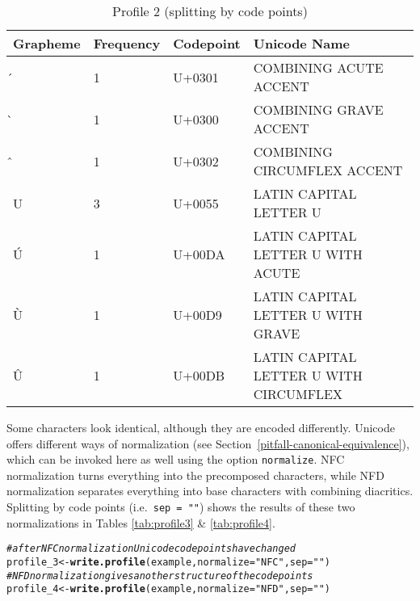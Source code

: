\documentclass[output=book,nonflat,modfonts,
citecolor=brown,
		]{langsci/langscibook}\usepackage[]{graphicx}\usepackage[]{color}
\makeatletter
\newcommand{\hlstr}[1]{\textcolor[rgb]{0.192,0.494,0.8}{#1}}%
\newcommand{\hlcom}[1]{\textcolor[rgb]{0.678,0.584,0.686}{\textit{#1}}}%
\newcommand{\hlstd}[1]{\textcolor[rgb]{0.345,0.345,0.345}{#1}}%
\newcommand{\hlkwb}[1]{\textcolor[rgb]{0.69,0.353,0.396}{#1}}%
\newcommand{\hlkwc}[1]{\textcolor[rgb]{0.333,0.667,0.333}{#1}}%
\newcommand{\hlkwd}[1]{\textcolor[rgb]{0.737,0.353,0.396}{\textbf{#1}}}%
\newenvironment{kframe}{%
 \def\at@end@of@kframe{}%
 \ifinner\ifhmode%
  \def\at@end@of@kframe{\end{minipage}}%
  \begin{minipage}{\columnwidth}%
 \fi\fi%
 \def\FrameCommand##1{\hskip\@totalleftmargin \hskip-\fboxsep
 \colorbox{shadecolor}{##1}\hskip-\fboxsep
     \hskip-\linewidth \hskip-\@totalleftmargin \hskip\columnwidth}%
 \MakeFramed {\advance\hsize-\width
   \@totalleftmargin\z@ \linewidth\hsize
   \@setminipage}}%
 {\par\unskip\endMakeFramed%
 \at@end@of@kframe}
\newenvironment{knitrout}{}{} %
\makeatother
\begin{document}
\begin{table}[H]
\centering
\begingroup\scriptsize
\begin{tabular}{llll}
  \toprule
Grapheme & Frequency & Codepoint & Unicode Name \\ 
  \midrule
́ & 1 & U+0301 & COMBINING ACUTE ACCENT \\ 
  ̀ & 1 & U+0300 & COMBINING GRAVE ACCENT \\ 
  ̂ & 1 & U+0302 & COMBINING CIRCUMFLEX ACCENT \\ 
  U & 3 & U+0055 & LATIN CAPITAL LETTER U \\ 
  Ú & 1 & U+00DA & LATIN CAPITAL LETTER U WITH ACUTE \\ 
  Ù & 1 & U+00D9 & LATIN CAPITAL LETTER U WITH GRAVE \\ 
  Û & 1 & U+00DB & LATIN CAPITAL LETTER U WITH CIRCUMFLEX \\ 
   \bottomrule
\end{tabular}
\endgroup
\caption{Profile 2 (splitting by code points)} 
\label{tab:profile2}
\end{table}


Some characters look identical, although they are encoded differently.
Unicode offers different ways of normalization (see
Section~\ref{pitfall-canonical-equivalence}), which can be invoked here as well
using the option \texttt{normalize}. NFC normalization turns everything into the
precomposed characters, while NFD normalization separates everything into base
characters with combining diacritics. Splitting by code points (i.e.\ \texttt{sep~=~""}) 
shows the results of these two normalizations in Tables \ref{tab:profile3} \& \ref{tab:profile4}.

\begin{knitrout}\footnotesize
{}\color{fgcolor}\begin{kframe}
\begin{alltt}
\hlcom{# after NFC normalization Unicode code points have changed}
\hlstd{profile_3} \hlkwb{<-} \hlkwd{write.profile}\hlstd{(example,} \hlkwc{normalize} \hlstd{=} \hlstr{"NFC"}\hlstd{,} \hlkwc{sep} \hlstd{=} \hlstr{""}\hlstd{)}
\hlcom{# NFD normalization gives another structure of the code points}
\hlstd{profile_4} \hlkwb{<-} \hlkwd{write.profile}\hlstd{(example,} \hlkwc{normalize} \hlstd{=} \hlstr{"NFD"}\hlstd{,} \hlkwc{sep} \hlstd{=} \hlstr{""}\hlstd{)}
\end{alltt}
\end{kframe}
\end{knitrout}
\end{document}

